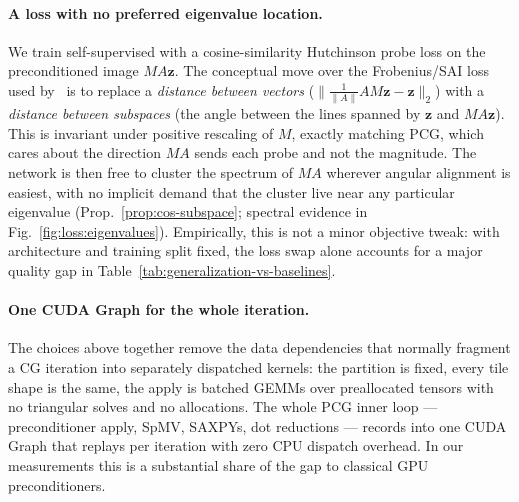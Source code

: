 \documentclass[acmtog]{acmart}
\theoremstyle{plain}
\begin{document}
\paragraph{A loss with no preferred eigenvalue location.}\label{intro:loss}\hypertarget{intro:loss}{}%
We train self-supervised with a cosine-similarity Hutchinson probe loss on the
preconditioned image $MA\mathbf{z}$. The conceptual move over the Frobenius/SAI loss
used by~\cite{Yang2025sparse} is to replace a \emph{distance between vectors}
($\|\tfrac{1}{\|A\|}AM\mathbf{z}-\mathbf{z}\|_2$) with a \emph{distance between
subspaces} (the angle between the lines spanned by $\mathbf{z}$ and $MA\mathbf{z}$).
This is invariant under positive rescaling of $M$, exactly matching PCG, which cares
about the direction $MA$ sends each probe and not the magnitude. The network is then
free to cluster the spectrum of $MA$ wherever angular alignment is easiest, with no
implicit demand that the cluster live near any particular eigenvalue
(Prop.~\ref{prop:cos-subspace}; spectral evidence in Fig.~\ref{fig:loss:eigenvalues}).
Empirically, this is not a minor objective tweak: with architecture and training split fixed,
the loss swap alone accounts for a major quality gap in Table~\ref{tab:generalization-vs-baselines}.

\paragraph{One CUDA Graph for the whole iteration.}\label{intro:cudagraph}\hypertarget{intro:cudagraph}{}%
The choices above together remove the data dependencies that normally fragment a CG
iteration into separately dispatched kernels: the partition is fixed, every tile shape
is the same, the apply is batched GEMMs over preallocated tensors with no triangular
solves and no allocations. The whole PCG inner loop --- preconditioner apply, SpMV,
SAXPYs, dot reductions --- records into one CUDA Graph that replays per iteration
with zero CPU dispatch overhead. In our measurements this is a substantial share of the
gap to classical GPU preconditioners.
\end{document}
